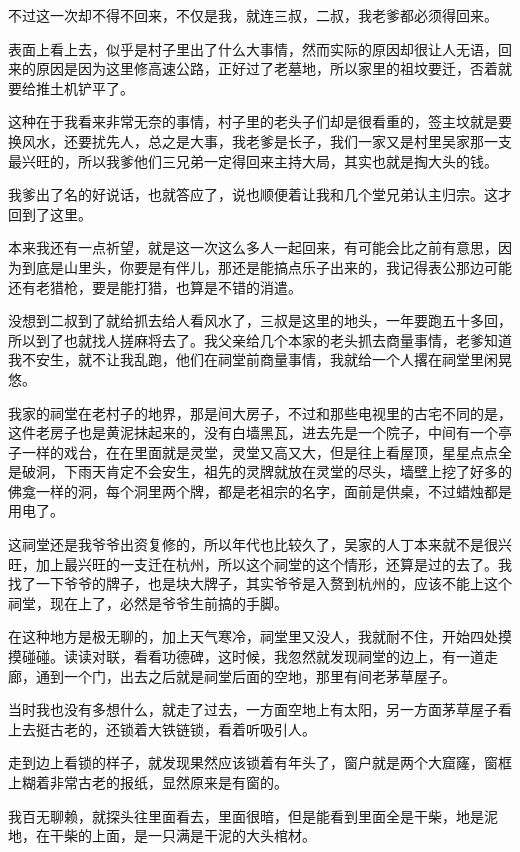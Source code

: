 不过这一次却不得不回来，不仅是我，就连三叔，二叔，我老爹都必须得回来。

表面上看上去，似乎是村子里出了什么大事情，然而实际的原因却很让人无语，回来的原因是因为这里修高速公路，正好过了老墓地，所以家里的祖坟要迁，否着就要给推土机铲平了。

这种在于我看来非常无奈的事情，村子里的老头子们却是很看重的，签主坟就是要换风水，还要扰先人，总之是大事，我老爹是长子，我们一家又是村里吴家那一支最兴旺的，所以我爹他们三兄弟一定得回来主持大局，其实也就是掏大头的钱。

我爹出了名的好说话，也就答应了，说也顺便着让我和几个堂兄弟认主归宗。这才回到了这里。

本来我还有一点祈望，就是这一次这么多人一起回来，有可能会比之前有意思，因为到底是山里头，你要是有伴儿，那还是能搞点乐子出来的，我记得表公那边可能还有老猎枪，要是能打猎，也算是不错的消遣。

没想到二叔到了就给抓去给人看风水了，三叔是这里的地头，一年要跑五十多回，所以到了也就找人搓麻将去了。我父亲给几个本家的老头抓去商量事情，老爹知道我不安生，就不让我乱跑，他们在祠堂前商量事情，我就给一个人撂在祠堂里闲晃悠。

我家的祠堂在老村子的地界，那是间大房子，不过和那些电视里的古宅不同的是，这件老房子也是黄泥抹起来的，没有白墙黑瓦，进去先是一个院子，中间有一个亭子一样的戏台，在在里面就是灵堂，灵堂又高又大，但是往上看屋顶，星星点点全是破洞，下雨天肯定不会安生，祖先的灵牌就放在灵堂的尽头，墙壁上挖了好多的佛龛一样的洞，每个洞里两个牌，都是老祖宗的名字，面前是供桌，不过蜡烛都是用电了。

这祠堂还是我爷爷出资复修的，所以年代也比较久了，吴家的人丁本来就不是很兴旺，加上最兴旺的一支迁在杭州，所以这个祠堂的这个情形，还算是过的去了。我找了一下爷爷的牌子，也是块大牌子，其实爷爷是入赘到杭州的，应该不能上这个祠堂，现在上了，必然是爷爷生前搞的手脚。

在这种地方是极无聊的，加上天气寒冷，祠堂里又没人，我就耐不住，开始四处摸摸碰碰。读读对联，看看功德碑，这时候，我忽然就发现祠堂的边上，有一道走廊，通到一个门，出去之后就是祠堂后面的空地，那里有间老茅草屋子。

当时我也没有多想什么，就走了过去，一方面空地上有太阳，另一方面茅草屋子看上去挺古老的，还锁着大铁链锁，看着听吸引人。

走到边上看锁的样子，就发现果然应该锁着有年头了，窗户就是两个大窟窿，窗框上糊着非常古老的报纸，显然原来是有窗的。

我百无聊赖，就探头往里面看去，里面很暗，但是能看到里面全是干柴，地是泥地，在干柴的上面，是一只满是干泥的大头棺材。

